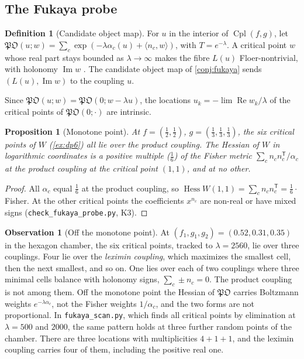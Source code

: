 \documentclass[11pt]{article}
\newtheorem{proposition}[theorem]{Proposition}
\theoremstyle{definition}
\newtheorem{definition}[theorem]{Definition}
\newtheorem{observation}[theorem]{Observation}
\theoremstyle{remark}
\newcommand{\Cpl}{\operatorname{Cpl}}
\begin{document}
\subsection{The Fukaya probe}\label{sec:fukprobe}

\begin{definition}[Candidate object map]\label{def:fukobj}
For $u$ in the interior of $\Cpl(f,g)$, let
$\mathfrak{PO}(u;w)=\sum_c\exp(-\lambda\alpha_c(u)+\langle n_c,w\rangle)$, with $T=e^{-\lambda}$. A critical point $w$ whose real part
stays bounded as $\lambda\to\infty$ makes the fibre $L(u)$ Floer-nontrivial, with holonomy $\operatorname{Im}w$ \cite{FOOO2010}.
The candidate object map of \cref{conj:fukaya} sends $(L(u),\operatorname{Im}w)$ to the coupling $u$.
\end{definition}

Since $\mathfrak{PO}(u;w)=\mathfrak{PO}(0;w-\lambda u)$, the locations $u_k=-\lim\operatorname{Re}w_k/\lambda$ of the critical points of
$\mathfrak{PO}(0;\cdot)$ are intrinsic.

\begin{proposition}[Monotone point]\label{prop:fukmono}
At $f=(\frac12,\frac12)$, $g=(\frac13,\frac13,\frac13)$, the six critical points of $W$ (\cref{ex:dp6}) all lie over the product
coupling. The Hessian of $W$ in logarithmic coordinates is a positive multiple ($\frac16$) of the Fisher metric
$\sum_cn_cn_c^{\mathsf T}/\alpha_c$ at the product coupling at the critical point $(1,1)$, and at no other.
\end{proposition}
\begin{proof}
All $\alpha_c$ equal $\frac16$ at the product coupling, so $\operatorname{Hess}W(1,1)=\sum_cn_cn_c^{\mathsf T}=\frac16\cdot$Fisher. At the other
critical points the coefficients $x^{n_c}$ are non-real or have mixed signs (\texttt{check\_fukaya\_probe.py}, K3).
\end{proof}

\begin{observation}[Off the monotone point]\label{obs:fukoff}
At $(f_1,g_1,g_2)=(0.52,0.31,0.35)$ in the hexagon chamber, the six critical points, tracked to $\lambda=2560$, lie over
three couplings. Four lie over the \emph{leximin coupling}, which maximizes the smallest cell, then the next smallest,
and so on. One lies over each of two couplings where three minimal cells balance with holonomy signs,
$\sum_c\pm n_c=0$. The product coupling is not among them. Off the monotone point the Hessian of $\mathfrak{PO}$ carries
Boltzmann weights $e^{-\lambda\alpha_c}$, not the Fisher weights $1/\alpha_c$, and the two forms are not proportional. In
\texttt{fukaya\_scan.py}, which finds all critical points by elimination at $\lambda=500$ and $2000$, the same pattern
holds at three further random points of the chamber. There are three locations with multiplicities $4+1+1$, and the
leximin coupling carries four of them, including the positive real one.
\end{observation}
\end{document}
